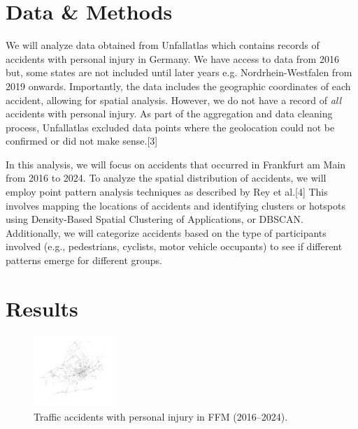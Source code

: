 \documentclass[10pt,a4paper]{article} %
\begin{document}
\section*{Data \& Methods}
We will analyze data obtained from Unfallatlas which contains records of accidents with personal injury in Germany. We have access to data from 2016 but, some states are not included until later years e.g. Nordrhein-Westfalen from 2019 onwards. Importantly, the data includes the geographic coordinates of each accident, allowing for spatial analysis. However, we do not have a record of \textit{all} accidents with personal injury. As part of the aggregation and data cleaning process, Unfallatlas excluded data points where the geolocation could not be confirmed or did not make sense.[3]\\
\par
In this analysis, we will focus on accidents that occurred in Frankfurt am Main from 2016 to 2024. To analyze the spatial distribution of accidents, we will employ point pattern analysis techniques as described by Rey et al.[4] This involves mapping the locations of accidents and identifying clusters or hotspots using Density-Based Spatial Clustering of Applications, or DBSCAN\@. Additionally, we will categorize accidents based on the type of participants involved (e.g., pedestrians, cyclists, motor vehicle occupants) to see if different patterns emerge for different groups.

\section*{Results}
\begin{figure}
    \centering
    \vspace{-20pt}
    \includegraphics[width=0.28\textwidth]{../src/img/ffm-2016-2024-bw.png} %
    \caption{Traffic accidents with personal injury in FFM (2016--2024).}
    \vspace{-10pt}
\end{figure}
\end{document}
